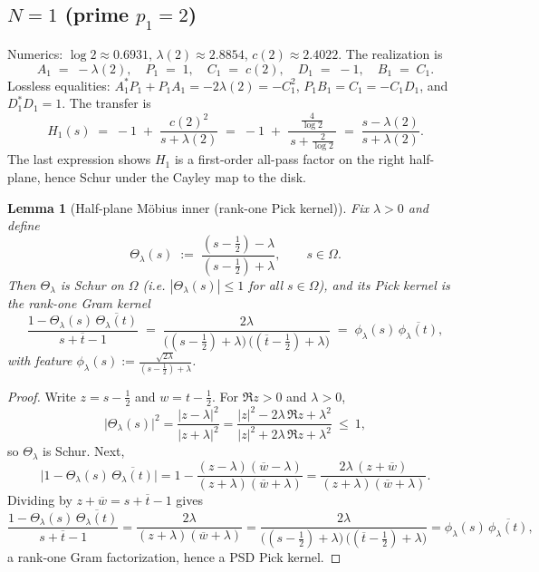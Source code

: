 \documentclass[11pt]{article}
\newtheorem{lemma}[theorem]{Lemma}
\theoremstyle{definition}
\theoremstyle{remark}
\begin{document}
\subsection*{$N=1$ (prime $p_1=2$)}
Numerics: \(\log 2\approx 0.6931\), \(\lambda(2)\approx 2.8854\), \(c(2)\approx 2.4022\). The realization is
\[
 A_1\;=\;-\lambda(2),\quad P_1\;=\;1,\quad C_1\;=\;c(2),\quad D_1\;=\;-1,\quad B_1\;=\;C_1.
\]
Lossless equalities: \(A_1^*P_1+P_1A_1=-2\lambda(2)=-C_1^2\), \(P_1B_1=C_1=-C_1 D_1\), and \(D_1^*D_1=1\). The transfer is
\[
 H_1(s)\;=\;-1\; +\; \frac{c(2)^2}{s+\lambda(2)}\;=\;-1\; +\;\frac{\tfrac{4}{\log 2}}{\,s+\tfrac{2}{\log 2}\,}\;=\;\frac{s-\lambda(2)}{s+\lambda(2)}.
\]
The last expression shows \(H_1\) is a first-order all-pass factor on the right half-plane, hence Schur under the Cayley map to the disk.

\begin{lemma}[Half-plane M\"obius inner (rank-one Pick kernel)]\label{lem:moebius-contract}
Fix \(\lambda>0\) and define
\[
  \Theta_\lambda(s)\;:=\;\frac{(s-\tfrac12)-\lambda}{(s-\tfrac12)+\lambda},\qquad s\in\Omega.
\]
Then \(\Theta_\lambda\) is Schur on \(\Omega\) (i.e. \(|\Theta_\lambda(s)|\le 1\) for all \(s\in\Omega\)), and its Pick kernel is the rank-one Gram kernel
\[
  \frac{1-\Theta_\lambda(s)\,\overline{\Theta_\lambda(t)}}{s+\overline t-1}
  \;=\; \frac{2\lambda}{\big((s-\tfrac12)+\lambda\big)\,\big((\overline t-\tfrac12)+\lambda\big)}
  \;=\; \phi_\lambda(s)\,\overline{\phi_\lambda(t)},
\]
with feature \(\displaystyle \phi_\lambda(s):=\frac{\sqrt{2\lambda}}{(s-\tfrac12)+\lambda}\).
\end{lemma}
\begin{proof}
Write \(z=s-\tfrac12\) and \(w=t-\tfrac12\). For \(\Re z>0\) and \(\lambda>0\),
\[
  \bigl|\Theta_\lambda(s)\bigr|^2
  =\frac{|z-\lambda|^2}{|z+\lambda|^2}
  =\frac{|z|^2-2\lambda\,\Re z+\lambda^2}{|z|^2+2\lambda\,\Re z+\lambda^2}\ \le\ 1,
\]
so \(\Theta_\lambda\) is Schur. Next,
\[
  \bigl|1-\Theta_\lambda(s)\,\overline{\Theta_\lambda(t)}\bigr|
  = 1-\frac{(z-\lambda)(\overline w-\lambda)}{(z+\lambda)(\overline w+\lambda)}
  = \frac{2\lambda\,(z+\overline w)}{(z+\lambda)(\overline w+\lambda)}.
\]
Dividing by \(z+\overline w=s+\overline t-1\) gives
\[
  \frac{1-\Theta_\lambda(s)\,\overline{\Theta_\lambda(t)}}{s+\overline t-1}
  = \frac{2\lambda}{(z+\lambda)(\overline w+\lambda)}
  = \frac{2\lambda}{\big((s-\tfrac12)+\lambda\big)\,\big((\overline t-\tfrac12)+\lambda\big)}
  = \phi_\lambda(s)\,\overline{\phi_\lambda(t)},
\]
a rank‑one Gram factorization, hence a PSD Pick kernel.
\end{proof}
\end{document}
